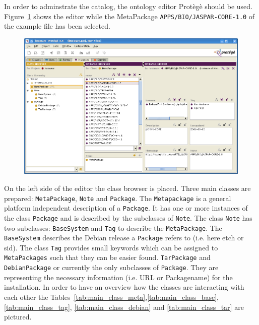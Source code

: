 In order to adminstrate the catalog, the ontology editor Prot\`eg\`e should be used. Figure~\ref{fig:protege_example} shows the
editor while the MetaPackage \texttt{APPS/BIO/JASPAR-CORE-1.0} of the example file has been selected.
\begin{figure}
  \begin{center}
    \includegraphics[width=\textwidth]{images/protege_JASPAR.png}
    \label{fig:protege_example}
  \end{center}
\end{figure}
On the left side of the editor the class browser is placed. Three main classes are prepared: \texttt{MetaPackage}, \texttt{Note} and \texttt{Package}.
The \texttt{Metapackage} is a general platform independent description of a \texttt{Package}. 
It has one or more instances of the class \texttt{Package} and is
described by the subclasses of \texttt{Note}. The class \texttt{Note} has two subclasses: \texttt{BaseSystem} 
and \texttt{Tag} to describe the \texttt{MetaPackage}. The \texttt{BaseSystem} describes the Debian release a \texttt{Package} refers to
(i.e. here etch or sid). The class \texttt{Tag} provides small keywords which can be assigned to \texttt{MetaPackages} such that
they can be easier found.  \texttt{TarPackage} and \texttt{DebianPackage} or currently the only subclasses of \texttt{Package}.
They are representing the necessary information (i.e. URL or Packagename) for the installation. In order to have an overview how the 
classes are interacting with each other the Tables~\ref{tab:main_class_meta},\ref{tab:main_class_base}, \ref{tab:main_class_tag},
\ref{tab:main_class_debian} and \ref{tab:main_class_tar} are pictured.


